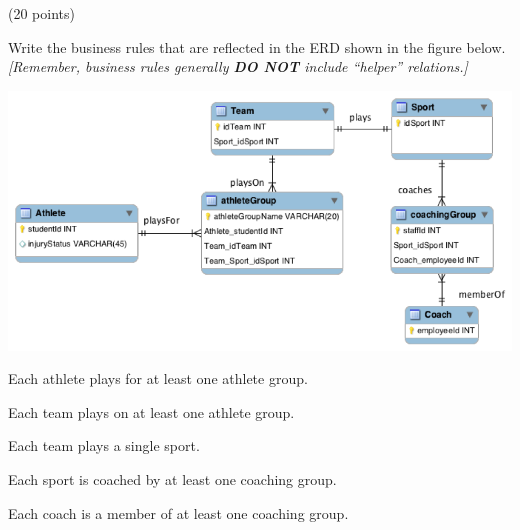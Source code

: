 \begin{problem} (20 points)

  \noindent
  Write the business rules that are reflected in the ERD shown in the figure below.
  \emph{[Remember, business rules generally \textbf{DO NOT} include
  ``helper'' relations.]}

  \includegraphics[scale=0.4]{res/03.png}
  
\end{problem}
\begin{Answer}
  \begin{enumalph}
    \item Each athlete plays for at least one athlete group.
    \item Each team plays on at least one athlete group.
    \item Each team plays a single sport.
    \item Each sport is coached by at least one coaching group.
    \item Each coach is a member of at least one coaching group.
  \end{enumalph}
\end{Answer}
